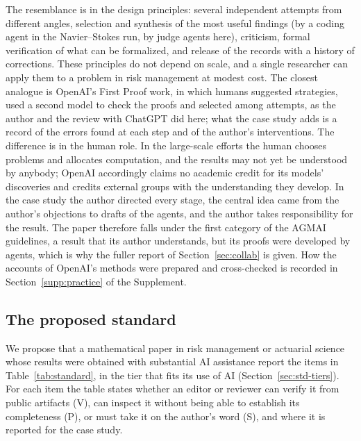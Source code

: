 The resemblance is in the design principles: several independent attempts from different angles, selection and
synthesis of the most useful findings (by a coding agent in the Navier--Stokes run, by judge agents here), criticism,
formal verification of what can be formalized, and release of the records with a history of corrections. These
principles do not depend on scale, and a single researcher can apply them to a problem in risk management at modest
cost. The closest analogue is OpenAI's First Proof work, in which humans suggested strategies, used a second model to
check the proofs and selected among attempts, as the author and the review with ChatGPT did here; what the case study
adds is a record of the errors found at each step and of the author's interventions. The difference is in the human
role. In the large-scale efforts the human chooses problems and allocates computation, and the results may not yet
be understood by anybody; OpenAI accordingly claims no academic credit for its models' discoveries and credits
external groups with the understanding they develop. In the case study the author directed every stage, the central
idea came from the author's objections to drafts of the agents, and the author takes responsibility for the result.
The paper therefore falls under the first category of the AGMAI guidelines, a result that its author understands, but
its proofs were developed by agents, which is why the fuller report of Section~\ref{sec:collab} is given. How the
accounts of OpenAI's methods were prepared and cross-checked is recorded in Section~\ref{supp:practice} of the
Supplement.


\subsection{The proposed standard}\label{sec:collab-standard}

We propose that a mathematical paper in risk management or actuarial science whose results were obtained with
substantial AI assistance report the items in Table~\ref{tab:standard}, in the tier that fits its use of AI
(Section~\ref{sec:std-tiers}). For each item the table states whether an editor or reviewer can verify it from
public artifacts (V), can inspect it without being able to establish its completeness (P), or must take it on the
author's word (S), and where it is reported for the case study.

